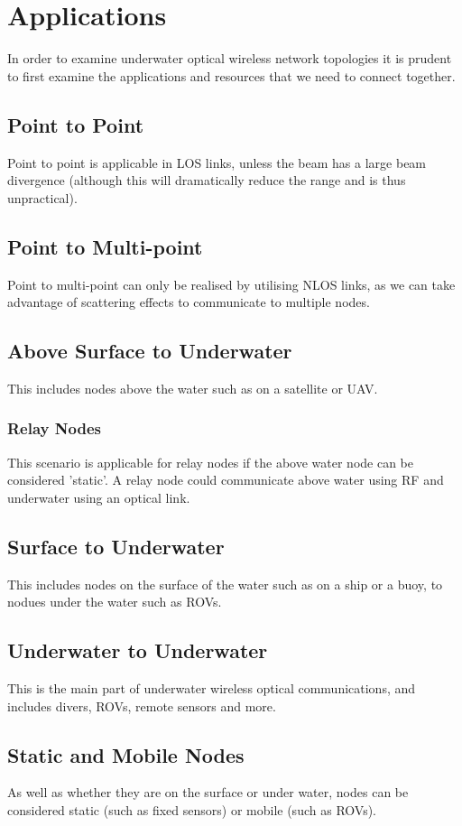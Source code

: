 \section{Applications}
In order to examine underwater optical wireless network topologies
it is prudent to first examine the applications and resources that
we need to connect together.

\subsection{Point to Point}
Point to point is applicable in \ac{LOS} links, unless the beam has a large
beam divergence (although this will dramatically reduce the range and is
thus unpractical).

\subsection{Point to Multi-point}
Point to multi-point can only be realised by utilising \ac{NLOS} links, as
we can take advantage of scattering effects to communicate to multiple nodes.

\subsection{Above Surface to Underwater}
This includes nodes above the water such as on a satellite or \ac{UAV}.

\subsubsection{Relay Nodes}
This scenario is applicable for relay nodes if the above water node
can be considered 'static'. A relay node could communicate above water
using RF and underwater using an optical link.

\subsection{Surface to Underwater}
This includes nodes on the surface of the water such as on a ship
or a buoy, to nodues under the water such as \ac{ROV}s.

\subsection{Underwater to Underwater}
This is the main part of underwater wireless optical communications, and
includes divers, \ac{ROV}s, remote sensors and more.

\subsection{Static and Mobile Nodes}
As well as whether they are on the surface or under water, nodes can be
considered static (such as fixed sensors) or mobile (such as \ac{ROV}s).